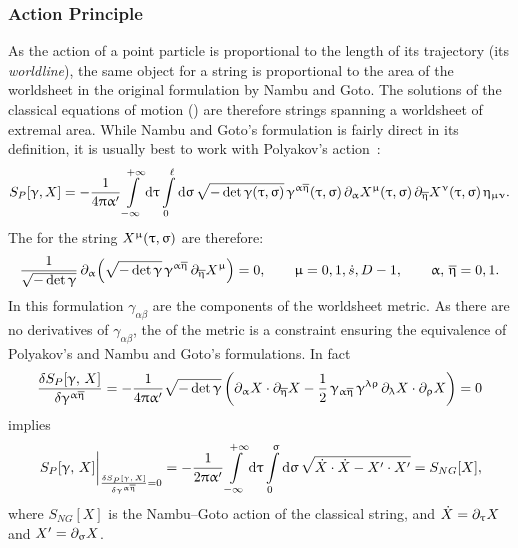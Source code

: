 \subsubsection{Action Principle}

As the action of a point particle is proportional to the length of its trajectory (its \emph{worldline}), the same object for a string is proportional to the area of the worldsheet in the original formulation by Nambu and Goto.
The solutions of the classical equations of motion (\eom) are therefore strings spanning a worldsheet of extremal area.
While Nambu and Goto's formulation is fairly direct in its definition, it is usually best to work with Polyakov's action~\cite{Polyakov:1981:QuantumGeometryBosonic}:
\begin{equation}
  S_P\qty[ \upgamma, X ]
  =
  -\frac{1}{4 \uppi \upalpha'}
  \int\limits_{-\infty}^{+\infty} \dd{\ensuremath{\uptau}}
  \int\limits_{0}^{\ell} \dd{\ensuremath{\upsigma}}
  \sqrt{- \det \upgamma\qty(\uptau, \upsigma)}\,
  \upgamma^{\upalpha\overline{\upeta}}\qty(\uptau, \upsigma)\,
  \partial_{\upalpha} X^{\upmu}\qty(\uptau, \upsigma)\,
  \partial_{\overline{\upeta}} X^{\upnu}\qty(\uptau, \upsigma)\,
  \upeta_{\upmu\upnu}.
  \label{eq:conf:polyakov}
\end{equation}
The \eom for the string $X^{\upmu}\qty(\uptau, \upsigma)$ are therefore:
\begin{equation}
  \frac{1}{\sqrt{- \det \upgamma}}\,
  \partial_{\upalpha}
  \qty(
    \sqrt{- \det \upgamma}\,
    \upgamma^{\upalpha\overline{\upeta}}\,
    \partial_{\overline{\upeta}} X^{\upmu}
  )
  =
  0,
  \qquad
  \upmu = 0, 1, \dot{s}, D - 1,
  \qquad
  \upalpha,\, \overline{\upeta} = 0, 1.
\end{equation}
In this formulation $\gamma_{\alpha\beta}$ are the components of the worldsheet metric.
As there are no derivatives of $\gamma_{\alpha\beta}$, the \eom of the metric is a constraint ensuring the equivalence of Polyakov's and Nambu and Goto's formulations.
In fact
\begin{equation}
  \fdv{S_P\qty[\gamma,\, X]}{\gamma^{\alpha\beta}}
  =
  - \frac{1}{4 \pi \ap}
  \sqrt{- \det \gamma}\,
  \qty(
    \ipd{\alpha} X \cdot \ipd{\beta} X
    -
    \frac{1}{2}\,
    \gamma_{\alpha\beta}\,
    \gamma^{\lambda\rho}\,
    \ipd{\lambda} X \cdot \ipd{\rho} X
  )
  =
  0
  \label{eq:conf:worldsheetmetric}
\end{equation}
implies
\begin{equation}
  \eval{S_P\qty[\gamma,\, X]}_{\fdv{S_P\qty[\gamma,\, X]}{\gamma^{\alpha\beta}} = 0}
  =
  - \frac{1}{2 \pi \ap}
  \infinfint{\tau}
  \finiteint{\sigma}{0}{\sigma}
  \sqrt{\dotX \cdot \dotX - \pX \cdot \pX}
  =
  S_{NG}[X],
\end{equation}
where $S_{NG}[X]$ is the Nambu--Goto action of the classical string, and $\dot{X} = \partial_{\uptau} X$ and $X' = \partial_{\upsigma} X$.

